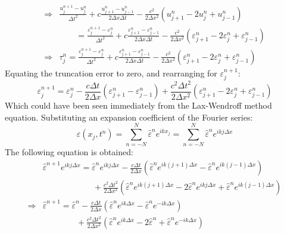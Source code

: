 \documentclass[12pt,a4]{article}
\begin{document}
\begin{enumerate}
\begin{enumerate}
\begin{align*}
          \Rightarrow & \frac{u^{n+1}_j - u^n_j}{\Delta t^2} + c \frac{u^{n}_{j + 1} - u^{n}_{j - 1}}{2 \Delta x \Delta t} - \frac{c^2 }{2 \Delta x^2}(u^n_{j + 1} - 2 u^n_j + u^n_{j-1})\\
                      &  \qquad = \frac{\varepsilon^{n+1}_j - \varepsilon^n_j}{\Delta t^2} + c \frac{\varepsilon^{n}_{j + 1} - \varepsilon^{n}_{j - 1}}{2 \Delta x \Delta t} - \frac{c^2 }{2 \Delta x^2}(\varepsilon^n_{j + 1} - 2 \varepsilon^n_j + \varepsilon^n_{j-1})\\
          \Rightarrow &  \tau^n_j = \frac{\varepsilon^{n+1}_j - \varepsilon^n_j}{\Delta t^2} + c \frac{\varepsilon^{n}_{j + 1} - \varepsilon^{n}_{j - 1}}{2 \Delta x \Delta t} - \frac{c^2 }{2 \Delta x^2}(\varepsilon^n_{j + 1} - 2 \varepsilon^n_j + \varepsilon^n_{j-1})
        \end{align*}
        Equating the truncation error to zero, and rearranging for $\varepsilon^{n+1}_j$:
        \begin{equation*}
          \varepsilon^{n+1}_j = \varepsilon^n_j - \frac{c \Delta t}{2 \Delta x } (\varepsilon^{n}_{j + 1} - \varepsilon^{n}_{j - 1})+ \frac{c^2 \Delta t^2}{2 \Delta x^2}(\varepsilon^n_{j + 1} - 2 \varepsilon^n_j + \varepsilon^n_{j-1})
        \end{equation*}
        Which could have been seen immediately from the Lax-Wendroff method equation.
        Substituting an expansion coefficient of the Fourier series:
        \begin{equation*}
            \varepsilon (x_j, t^n) = \sum_{n = -N}^N \hat \varepsilon^n e^{ikx_j} = \sum_{n = -N}^N \hat \varepsilon^n e^{ikj \Delta x}
        \end{equation*}
        The following equation is obtained:
        \begin{align*}
                      & \hat \varepsilon^{n + 1}e^{i k j\Delta x} = \hat \varepsilon^ne^{ikj\Delta x} - \frac{c \Delta t}{2 \Delta x } (\hat\varepsilon^{n}e^{ik(j + 1)\Delta x} - \hat \varepsilon^{n}e^{ik(j - 1)\Delta x}) \\
                      & \qquad \qquad \qquad + \frac{c^2 \Delta t^2}{2 \Delta x^2}(\hat \varepsilon^ne^{ik(j + 1)\Delta x} - 2 \hat \varepsilon^ne^{ikj\Delta x} + \hat \varepsilon^ne^{ik(j-1)\Delta x}) \\
          \Rightarrow & \hat \varepsilon^{n + 1} = \hat \varepsilon^n - \frac{c \Delta t}{2 \Delta x } (\hat\varepsilon^{n}e^{ik\Delta x} - \hat \varepsilon^{n}e^{-ik\Delta x}) \\
                      & \qquad \qquad + \frac{c^2 \Delta t^2}{2 \Delta x^2}(\hat \varepsilon^ne^{ik\Delta x} - 2 \hat \varepsilon^n + \hat \varepsilon^ne^{-ik\Delta x}) \\

\end{align*}
\end{enumerate}
\end{enumerate}
\end{document}
